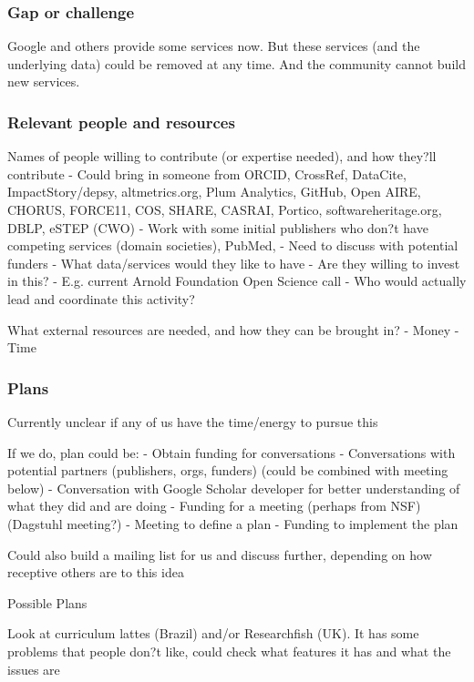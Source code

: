 \subsubsection{Gap or challenge}

Google and others provide some services now.
But these services (and the underlying data) could be removed at any time.
And the community cannot build new services.

\subsubsection{Relevant people and resources}

Names of people willing to contribute (or expertise needed), and how they?ll contribute
- Could bring in someone from ORCID, CrossRef, DataCite, ImpactStory/depsy, altmetrics.org, Plum Analytics, GitHub, Open AIRE, CHORUS, FORCE11, COS, SHARE, CASRAI, Portico, softwareheritage.org, DBLP, eSTEP (CWO)
- Work with some initial publishers who don?t have competing services (domain societies), PubMed, 
- Need to discuss with potential funders
   - What data/services would they like to have
      - Are they willing to invest in this?
      - E.g. current Arnold Foundation Open Science call
- Who would actually lead and coordinate this activity?

What external resources are needed, and how they can be brought in?
- Money
- Time


\subsubsection{Plans}

Currently unclear if any of us have the time/energy to pursue this

If we do, plan could be:
- Obtain funding for conversations
- Conversations with potential partners (publishers, orgs, funders) (could be combined with meeting below)
- Conversation with Google Scholar developer for better understanding of what they did and are doing
- Funding for a meeting (perhaps from NSF) (Dagstuhl meeting?)
- Meeting to define a plan
- Funding to implement the plan

Could also build a mailing list for us and discuss further, depending on how receptive others are to this idea


Possible Plans

Look at curriculum lattes (Brazil) and/or Researchfish (UK).  It has some problems that people don?t like, could check what features it has and what the issues are

